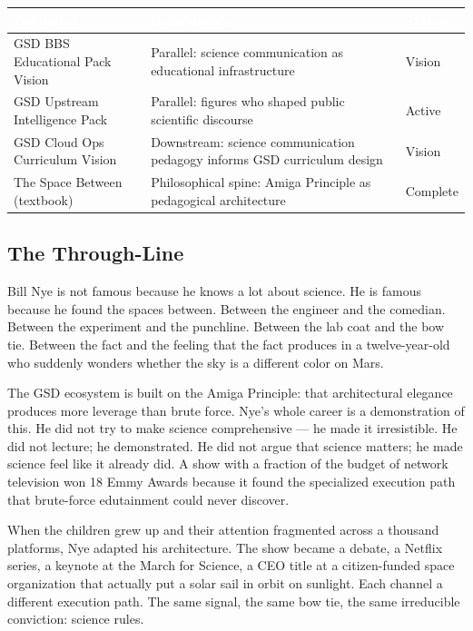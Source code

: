 \documentclass[11pt,letterpaper]{article}
\newcommand{\tableheader}[1]{\textbf{\sffamily\textcolor{white}{#1}}}
\begin{document}
\begin{center}
\begin{tabularx}{\textwidth}{L{3.5cm}XC{2cm}}
\toprule
{}
\tableheader{Document} & \tableheader{Relationship} & \tableheader{Status} \\
\midrule
GSD BBS Educational Pack Vision & Parallel: science communication as educational infrastructure & Vision \\
GSD Upstream Intelligence Pack & Parallel: figures who shaped public scientific discourse & Active \\
GSD Cloud Ops Curriculum Vision & Downstream: science communication pedagogy informs GSD curriculum design & Vision \\
The Space Between (textbook) & Philosophical spine: Amiga Principle as pedagogical architecture & Complete \\
\bottomrule
\end{tabularx}
\end{center}

\subsection{The Through-Line}

Bill Nye is not famous because he knows a lot about science. He is famous because he found the spaces between. Between the engineer and the comedian. Between the experiment and the punchline. Between the lab coat and the bow tie. Between the fact and the feeling that the fact produces in a twelve-year-old who suddenly wonders whether the sky is a different color on Mars.

The GSD ecosystem is built on the Amiga Principle: that architectural elegance produces more leverage than brute force. Nye's whole career is a demonstration of this. He did not try to make science comprehensive --- he made it irresistible. He did not lecture; he demonstrated. He did not argue that science matters; he made science feel like it already did. A show with a fraction of the budget of network television won 18 Emmy Awards because it found the specialized execution path that brute-force edutainment could never discover.

When the children grew up and their attention fragmented across a thousand platforms, Nye adapted his architecture. The show became a debate, a Netflix series, a keynote at the March for Science, a CEO title at a citizen-funded space organization that actually put a solar sail in orbit on sunlight. Each channel a different execution path. The same signal, the same bow tie, the same irreducible conviction: science rules.
\end{document}
